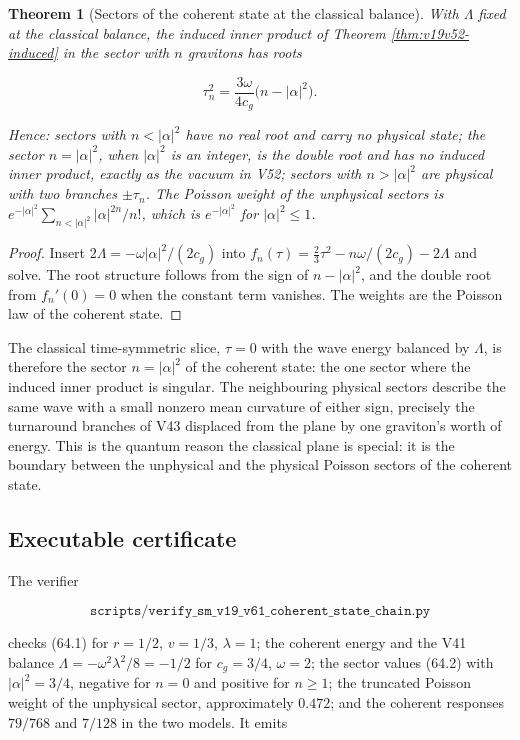 \documentclass[11pt]{article}
\newtheorem{theorem}{Theorem}[section]
\theoremstyle{remark}
\begin{document}
\begin{theorem}[Sectors of the coherent state at the classical balance]
\label{thm:v19v61-sectors}
With \(\Lambda\) fixed at the classical balance, the induced inner
product of Theorem \ref{thm:v19v52-induced} in the sector with \(n\)
gravitons has roots

\[
 \tau_n^2=\frac{3\omega}{4c_g}\bigl(n-|\alpha|^2\bigr).                 \tag{64.2}
\]

Hence: sectors with \(n<|\alpha|^2\) have no real root and carry no
physical state; the sector \(n=|\alpha|^2\), when \(|\alpha|^2\) is an
integer, is the double root and has no induced inner product, exactly
as the vacuum in V52; sectors with \(n>|\alpha|^2\) are physical with
two branches \(\pm\tau_n\).  The Poisson weight of the unphysical
sectors is \(e^{-|\alpha|^2}\sum_{n<|\alpha|^2}|\alpha|^{2n}/n!\), which
is \(e^{-|\alpha|^2}\) for \(|\alpha|^2\leq1\).
\end{theorem}

\begin{proof}
Insert \(2\Lambda=-\omega|\alpha|^2/(2c_g)\) into
\(f_n(\tau)=\tfrac23\tau^2-n\omega/(2c_g)-2\Lambda\) and solve.  The
root structure follows from the sign of \(n-|\alpha|^2\), and the
double root from \(f_n'(0)=0\) when the constant term vanishes.  The
weights are the Poisson law of the coherent state.
\end{proof}

The classical time-symmetric slice, \(\tau=0\) with the wave energy
balanced by \(\Lambda\), is therefore the sector \(n=|\alpha|^2\) of the
coherent state: the one sector where the induced inner product is
singular.  The neighbouring physical sectors describe the same wave
with a small nonzero mean curvature of either sign, precisely the
turnaround branches of V43 displaced from the plane by one graviton's
worth of energy.  This is the quantum reason the classical plane is
special: it is the boundary between the unphysical and the physical
Poisson sectors of the coherent state.

\subsection{Executable certificate}

The verifier

\[
 \texttt{scripts/verify\_sm\_v19\_v61\_coherent\_state\_chain.py}    \tag{64.3}
\]

checks (64.1) for \(r=1/2\), \(v=1/3\), \(\lambda=1\); the coherent
energy and the V41 balance \(\Lambda=-\omega^2\lambda^2/8=-1/2\) for
\(c_g=3/4\), \(\omega=2\); the sector values (64.2) with
\(|\alpha|^2=3/4\), negative for \(n=0\) and positive for \(n\geq1\);
the truncated Poisson weight of the unphysical sector, approximately
\(0.472\); and the coherent responses \(79/768\) and \(7/128\) in the
two models.  It emits
\end{document}
